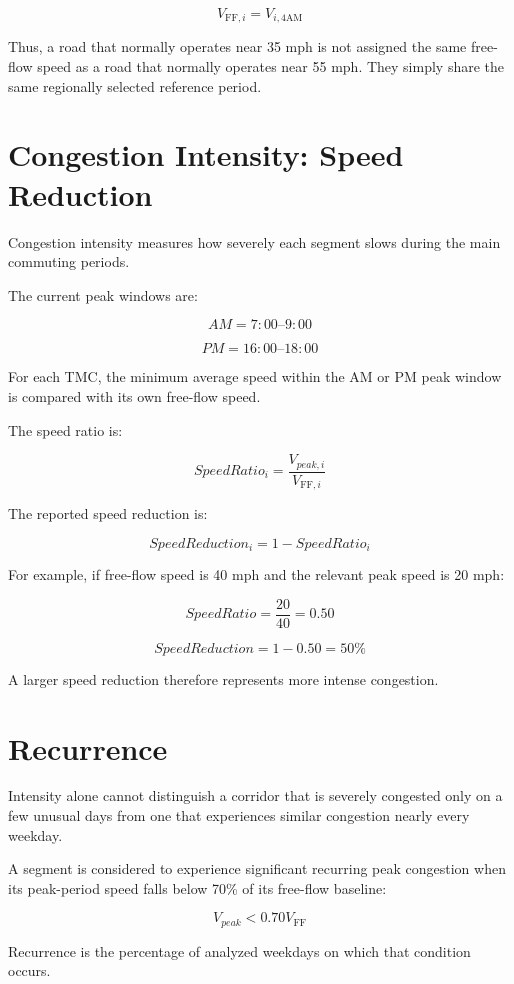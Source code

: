 \documentclass[11pt]{article}
\begin{document}
\[
\boxed{V_{\mathrm{FF},i} = V_{i,4\mathrm{AM}}}
\]

Thus, a road that normally operates near 35 mph is not assigned the same free-flow speed as a road that normally operates near 55 mph. They simply share the same regionally selected reference period.

\section{Congestion Intensity: Speed Reduction}

Congestion intensity measures how severely each segment slows during the main commuting periods.

The current peak windows are:

\[
AM = 7{:}00\text{--}9{:}00
\]

\[
PM = 16{:}00\text{--}18{:}00
\]

For each TMC, the minimum average speed within the AM or PM peak window is compared with its own free-flow speed.

The speed ratio is:

\[
\boxed{SpeedRatio_i = \frac{V_{peak,i}}{V_{\mathrm{FF},i}}}
\]

The reported speed reduction is:

\[
\boxed{SpeedReduction_i = 1 - SpeedRatio_i}
\]

For example, if free-flow speed is 40 mph and the relevant peak speed is 20 mph:

\[
SpeedRatio = \frac{20}{40} = 0.50
\]

\[
SpeedReduction = 1 - 0.50 = 50\%
\]

A larger speed reduction therefore represents more intense congestion.

\section{Recurrence}

Intensity alone cannot distinguish a corridor that is severely congested only on a few unusual days from one that experiences similar congestion nearly every weekday.

A segment is considered to experience significant recurring peak congestion when its peak-period speed falls below 70\% of its free-flow baseline:

\[
\boxed{V_{peak} < 0.70V_{\mathrm{FF}}}
\]

Recurrence is the percentage of analyzed weekdays on which that condition occurs.
\end{document}
